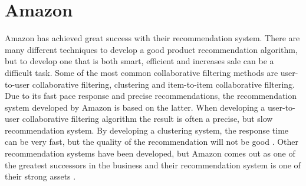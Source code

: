 \section{Amazon}
Amazon has achieved great success with their recommendation system. There are many different techniques to develop a good product recommendation algorithm, but to develop one that is both smart, efficient and increases sale can be a difficult task. Some of the most common collaborative filtering methods are user-to-user collaborative filtering, clustering and item-to-item collaborative filtering. Due to its fast pace response and precise recommendations, the recommendation system developed by \gls{Amazon} is based on the latter. When developing a user-to-user collaborative filtering algorithm the result is often a precise, but slow recommendation system. By developing a clustering system, the response time can be very fast, but the quality of the recommendation will not be good \cite{AmazonRecommendations}. Other recommendation systems have been developed, but Amazon comes out as one of the greatest successors in the business and their recommendation system is one of their strong assets \cite{AmazonSuccess2}.
